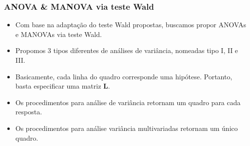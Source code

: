 \documentclass[10pt,
  aspectratio=169,
  serif,
  mathserif,
  professionalfont,
  compress,
  handout,
  ]{beamer}\usepackage[]{graphicx}\usepackage[]{color}
\begin{document}

\begin{frame}

\frametitle{ANOVA \& MANOVA via teste Wald}

\begin{itemize}
    \itemsep 2ex

  \item Com base na adaptação do teste Wald propostas, buscamos propor ANOVAs e MANOVAs via teste Wald.

  \item Propomos 3 tipos diferentes de análises de variância, nomeadas tipo I, II e III.

  \item Basicamente, cada linha do quadro corresponde uma hipótese. Portanto, basta especificar uma matriz $\boldsymbol{L}$.

  \item Os procedimentos para análise de variância retornam um quadro para cada resposta.

  \item Os procedimentos para análise variância multivariadas retornam um único quadro. 
\end{itemize}

\end{frame}

\end{document}
